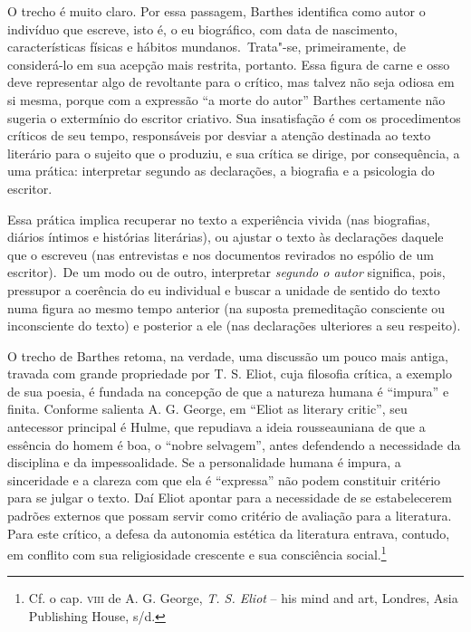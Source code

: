 O trecho é muito claro. Por essa passagem, Barthes identifica como autor
o indivíduo que escreve, isto é, o eu biográfico, com data de
nascimento, características físicas e hábitos mundanos.~Trata"-se,
primeiramente, de considerá-lo em sua acepção mais restrita, portanto.
Essa figura de carne e osso deve representar algo de revoltante para o
crítico, mas talvez não seja odiosa em si mesma, porque com a expressão
``a morte do autor'' Barthes certamente não sugeria o extermínio do
escritor criativo. Sua insatisfação é com os procedimentos críticos de
seu tempo, responsáveis por desviar a atenção destinada ao texto
literário para o sujeito que o produziu, e sua crítica se dirige, por
consequência, a uma prática: interpretar segundo as declarações, a
biografia e a psicologia do escritor.

Essa prática implica recuperar no texto a experiência vivida (nas
biografias, diários íntimos e histórias literárias), ou ajustar o texto
às declarações daquele que o escreveu (nas entrevistas e nos documentos
revirados no espólio de um escritor).~De um modo ou de outro,
interpretar \emph{segundo o autor} significa, pois, pressupor a coerência do eu
individual e buscar a unidade de sentido do texto numa figura ao mesmo
tempo anterior (na suposta premeditação consciente ou inconsciente do
texto) e posterior a ele (nas declarações ulteriores a seu respeito).

O trecho de Barthes retoma, na verdade, uma discussão um pouco mais
antiga, travada com grande propriedade por T. S. Eliot, cuja filosofia
crítica, a exemplo de sua poesia, é fundada na concepção de que a
natureza humana é ``impura'' e finita. Conforme salienta A. G. George,
em ``Eliot as literary critic'', seu antecessor principal é Hulme, que
repudiava a ideia rousseauniana de que a essência do homem é boa, o
``nobre selvagem'', antes defendendo a necessidade da disciplina e da
impessoalidade. Se a personalidade humana é impura, a sinceridade e a
clareza com que ela é ``expressa'' não podem constituir critério para se
julgar o texto. Daí Eliot apontar para a necessidade de se estabelecerem
padrões externos que possam servir como critério de avaliação para a
literatura. Para este crítico, a defesa da autonomia estética da
literatura entrava, contudo, em conflito com sua religiosidade crescente
e sua consciência social.\footnote{Cf. o cap. \textsc{viii} de A. G.
  George, \emph{T. S. Eliot} -- his mind and art, Londres, Asia
  Publishing House, s/d.}


